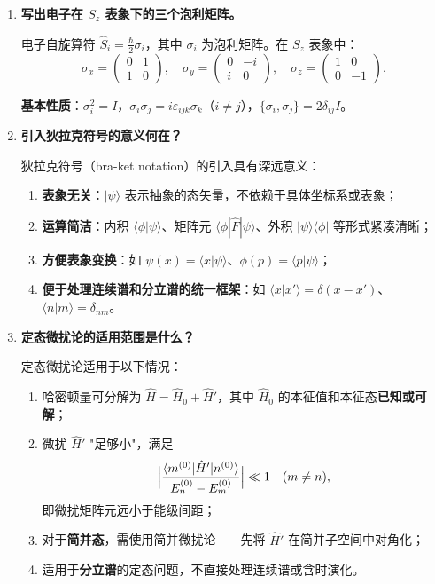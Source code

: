 \begin{enumerate}[label=\textbf{\arabic*.}, leftmargin=2em, itemsep=0.8em, resume]

\item \textbf{写出电子在 $S_z$ 表象下的三个泡利矩阵。}

电子自旋算符 $\hat{S}_i = \frac{\hbar}{2}\sigma_i$，其中 $\sigma_i$ 为泡利矩阵。在 $S_z$ 表象中：
\[
    \sigma_x = \begin{pmatrix} 0 & 1 \\ 1 & 0 \end{pmatrix},\quad
    \sigma_y = \begin{pmatrix} 0 & -i \\ i & 0 \end{pmatrix},\quad
    \sigma_z = \begin{pmatrix} 1 & 0 \\ 0 & -1 \end{pmatrix}.
\]

\textbf{基本性质}：$\sigma_i^2 = I$，$\sigma_i\sigma_j = i\varepsilon_{ijk}\sigma_k$（$i\neq j$），$\{\sigma_i,\sigma_j\} = 2\delta_{ij}I$。

\item \textbf{引入狄拉克符号的意义何在？}

狄拉克符号（bra-ket notation）的引入具有深远意义：
\begin{enumerate}[nosep, label=(\arabic*)]
    \item \textbf{表象无关}：$|\psi\rangle$ 表示抽象的态矢量，不依赖于具体坐标系或表象；
    \item \textbf{运算简洁}：内积 $\langle\phi|\psi\rangle$、矩阵元 $\langle\phi|\hat{F}|\psi\rangle$、外积 $|\psi\rangle\langle\phi|$ 等形式紧凑清晰；
    \item \textbf{方便表象变换}：如 $\psi(x) = \langle x|\psi\rangle$、$\phi(p) = \langle p|\psi\rangle$；
    \item \textbf{便于处理连续谱和分立谱的统一框架}：如 $\langle x|x'\rangle = \delta(x-x')$、$\langle n|m\rangle = \delta_{nm}$。
\end{enumerate}

\item \textbf{定态微扰论的适用范围是什么？}

定态微扰论适用于以下情况：
\begin{enumerate}[nosep, label=(\arabic*)]
    \item 哈密顿量可分解为 $\hat{H} = \hat{H}_0 + \hat{H}'$，其中 $\hat{H}_0$ 的本征值和本征态\textbf{已知或可解}；
    \item 微扰 $\hat{H}'$ "足够小"，满足
    \[
        \Bigl|\frac{\langle m^{(0)}|\hat{H}'|n^{(0)}\rangle}{E_n^{(0)} - E_m^{(0)}}\Bigr| \ll 1 \quad (m\neq n),
    \]
    即微扰矩阵元远小于能级间距；
    \item 对于\textbf{简并态}，需使用简并微扰论——先将 $\hat{H}'$ 在简并子空间中对角化；
    \item 适用于\textbf{分立谱}的定态问题，不直接处理连续谱或含时演化。
\end{enumerate}


\end{enumerate}
